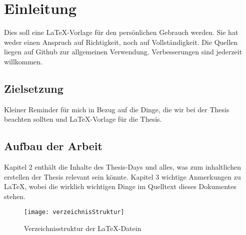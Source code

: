 \section{Einleitung}
Dies soll eine \LaTeX{}-Vorlage für den persönlichen Gebrauch werden. Sie hat weder einen Anspruch auf Richtigkeit, noch auf Vollständigkeit. Die Quellen liegen auf Github zur allgemeinen Verwendung. Verbesserungen sind jederzeit willkommen. 

\subsection{Zielsetzung}
Kleiner Reminder für mich in Bezug auf die Dinge, die wir bei der Thesis beachten sollten und \LaTeX{}-Vorlage für die Thesis.

\subsection{Aufbau der Arbeit}
Kapitel 2 enthält die Inhalte des Thesis-Days und alles, was zum inhaltlichen erstellen der Thesis relevant sein könnte. Kapitel 3 wichtige Anmerkungen zu \LaTeX{}, wobei die wirklich wichtigen Dinge im Quelltext dieses Dokumentes stehen. 

\begin{figure}[H]
\begin{center}
\texttt{[image: verzeichnisStruktur]}
\caption{Verzeichnisstruktur der \LaTeX{}-Datein}
\end{center}
\end{figure}
